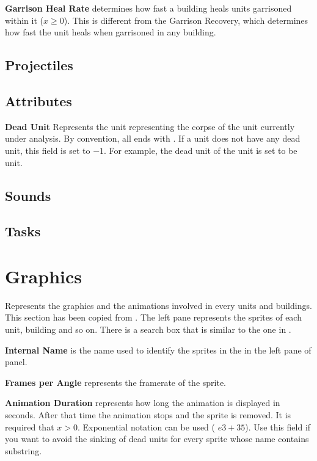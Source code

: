 \begin{appendices}
    \textbf{Garrison Heal Rate} determines how fast a building heals units garrisoned within it ($x \geq 0$). This is different from the Garrison Recovery, which determines how fast the unit heals when garrisoned in any building\cite{agewiki:2014}.

    \subsection{Projectiles}

    \subsection{Attributes}

    \textbf{Dead Unit} Represents the unit representing the corpse of the unit currently under analysis. By convention, all  ends with . If a unit does not have any dead unit, this field is set to $-1$. For example, the dead unit of the unit  is set to be  unit.

    \subsection{Sounds}

    \subsection{Tasks}

    \section{Graphics}

    Represents the graphics and the animations involved in every units and buildings. This section has been copied from \cite{agewiki:grpahics:2014}. The left pane represents the sprites of each unit, building and so on. There is a search box that is similar to the one in .

    \textbf{Internal Name} is the name used to identify the sprites in the \genie{} in the left pane of  panel.

    \textbf{Frames per Angle} represents the framerate of the sprite.

    \textbf{Animation Duration} represents how long the animation is displayed in seconds. After that time the animation stops and the sprite is removed. It is required that $x > 0$. Exponential notation can be used (\eg{} $e3+35$). Use this field if you want to avoid the sinking of dead units for every sprite whose name contains  substring.


\end{appendices}
